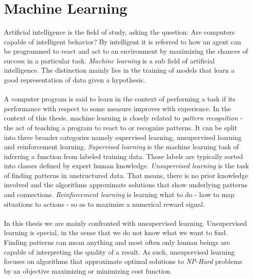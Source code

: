\section{Machine Learning}
\label{sec:ml_intro}
  \paragraph{} Artificial intelligence is the field of study, asking the question: Are computers capable of intelligent behavior? By intelligent it is referred to how an agent can be programmed to react and act to an environment by maximizing the chances of success in a particular task. \emph{Machine learning} is a sub field of artificial intelligence. The distinction mainly lies in the training of models that learn a good representation of data given a hypothesis.

  \paragraph{} A computer program is said to learn in the context of performing a task if its performance with respect to some measure improves with experience. In the context of this thesis, machine learning is closely related to \emph{pattern recognition} - the act of teaching a program to react to or recognize patterns. It can be split into three broader categories namely supervised learning, unsupervised learning and reinforcement learning. \emph{Supervised learning} is the machine learning task of inferring a function from labeled training data. Those labels are typically sorted into classes defined by expert human knowledge. \emph{Unsupervised learning} is the task of finding patterns in unstructured data. That means, there is no prior knowledge involved and the algorithms approximate solutions that show underlying patterns and connections. \emph{Reinforcement learning} is learning what to do - how to map situations to actions - so as to maximize a numerical reward signal.

  \paragraph{} In this thesis we are mainly confronted with unsupervised learning. Unsupervised learning is special, in the sense that we do not know what we want to find. Finding patterns can mean anything and most often only human beings are capable of interpreting the quality of a result. As such, unsupervised learning focuses on algorithms that approximate optimal solutions to \emph{NP-Hard} problems by an objective maximizing or minimizing cost function.

